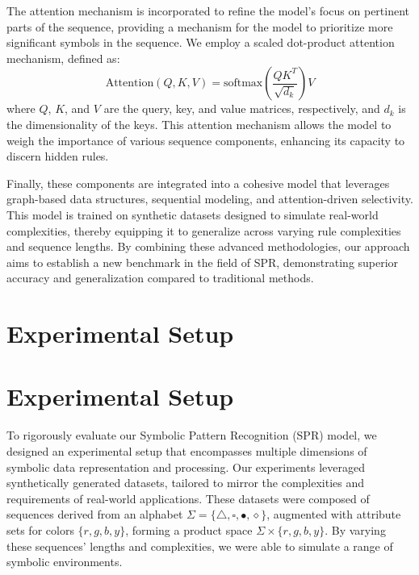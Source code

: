 \documentclass{article}
\begin{document}
The attention mechanism is incorporated to refine the model's focus on pertinent parts of the sequence, providing a mechanism for the model to prioritize more significant symbols in the sequence. We employ a scaled dot-product attention mechanism, defined as:
\[
\text{Attention}(Q, K, V) = \text{softmax}\left(\frac{QK^T}{\sqrt{d_k}}\right)V
\]
where $Q$, $K$, and $V$ are the query, key, and value matrices, respectively, and $d_k$ is the dimensionality of the keys. This attention mechanism allows the model to weigh the importance of various sequence components, enhancing its capacity to discern hidden rules.

Finally, these components are integrated into a cohesive model that leverages graph-based data structures, sequential modeling, and attention-driven selectivity. This model is trained on synthetic datasets designed to simulate real-world complexities, thereby equipping it to generalize across varying rule complexities and sequence lengths. By combining these advanced methodologies, our approach aims to establish a new benchmark in the field of SPR, demonstrating superior accuracy and generalization compared to traditional methods.

\section{Experimental Setup}
\section{Experimental Setup}
To rigorously evaluate our Symbolic Pattern Recognition (SPR) model, we designed an experimental setup that encompasses multiple dimensions of symbolic data representation and processing. Our experiments leveraged synthetically generated datasets, tailored to mirror the complexities and requirements of real-world applications. These datasets were composed of sequences derived from an alphabet $\Sigma = \{\triangle, \square, \bullet, \diamond\}$, augmented with attribute sets for colors $\{r, g, b, y\}$, forming a product space $\Sigma \times \{r, g, b, y\}$. By varying these sequences' lengths and complexities, we were able to simulate a range of symbolic environments.
\end{document}

